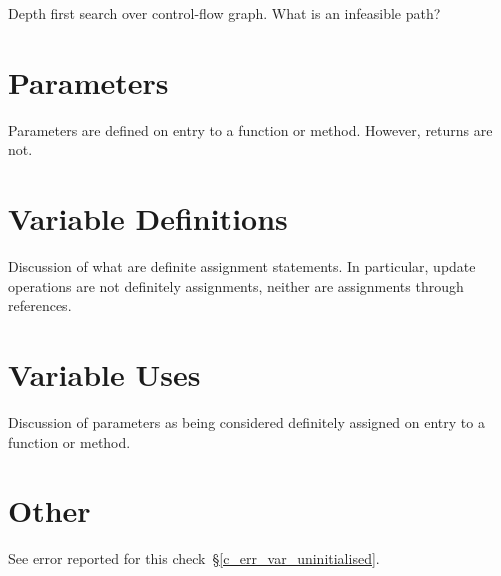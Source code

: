 Depth first search over control-flow graph.  What is an infeasible path?


\section{Parameters}

Parameters are defined on entry to a function or method.  However, returns are not.

\section{Variable Definitions}

Discussion of what are definite assignment statements.  In particular, update operations are not definitely assignments, neither are assignments through references.

\section{Variable Uses}

Discussion of parameters as being considered definitely assigned on entry to a function or method.

\section{Other}

See error reported for this check~\S\ref{c_err_var_uninitialised}.

